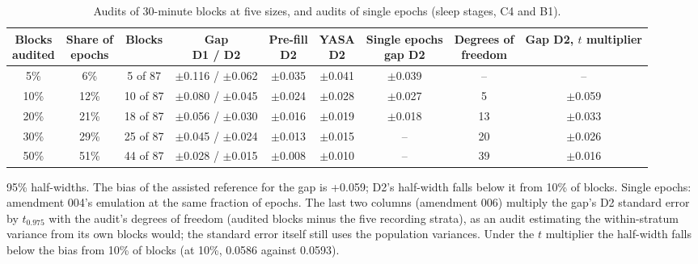\begin{table}[h!]
\centering
\footnotesize
\caption{Audits of 30-minute blocks at five sizes, and audits of single epochs (sleep stages, C4 and B1).}
\label{tab:s-blocks}
\begin{adjustbox}{max width=\linewidth}
\begin{tabular}{ccccccccc}
\toprule
\makecell{Blocks\\audited} & \makecell{Share of\\epochs} & Blocks & \makecell{Gap\\D1 / D2} & \makecell{Pre-fill\\D2} & \makecell{YASA\\D2} & \makecell{Single epochs\\gap D2} & \makecell{Degrees of\\freedom} & \makecell{Gap D2,\\$t$ multiplier} \\
\midrule
5\% & 6\% & 5 of 87 & $\pm$0.116 / $\pm$0.062 & $\pm$0.035 & $\pm$0.041 & $\pm$0.039 & -- & -- \\
10\% & 12\% & 10 of 87 & $\pm$0.080 / $\pm$0.045 & $\pm$0.024 & $\pm$0.028 & $\pm$0.027 & 5 & $\pm$0.059 \\
20\% & 21\% & 18 of 87 & $\pm$0.056 / $\pm$0.030 & $\pm$0.016 & $\pm$0.019 & $\pm$0.018 & 13 & $\pm$0.033 \\
30\% & 29\% & 25 of 87 & $\pm$0.045 / $\pm$0.024 & $\pm$0.013 & $\pm$0.015 & -- & 20 & $\pm$0.026 \\
50\% & 51\% & 44 of 87 & $\pm$0.028 / $\pm$0.015 & $\pm$0.008 & $\pm$0.010 & -- & 39 & $\pm$0.016 \\
\bottomrule
\end{tabular}
\end{adjustbox}
\par\smallskip
\begin{minipage}{0.95\linewidth}\footnotesize 95\% half-widths. The bias of the assisted reference for the gap is +0.059; D2's half-width falls below it from 10\% of blocks. Single epochs: amendment 004's emulation at the same fraction of epochs. The last two columns (amendment 006) multiply the gap's D2 standard error by $t_{0.975}$ with the audit's degrees of freedom (audited blocks minus the five recording strata), as an audit estimating the within-stratum variance from its own blocks would; the standard error itself still uses the population variances. Under the $t$ multiplier the half-width falls below the bias from 10\% of blocks (at 10\%, 0.0586 against 0.0593).\end{minipage}
\end{table}
